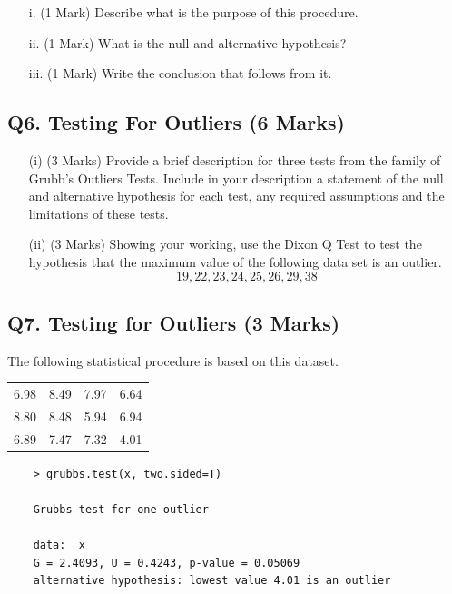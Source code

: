 \documentclass[a4paper,12pt]{article}
\begin{document}
\begin{itemize}
	\item[i.] (1 Mark) Describe what is the purpose of this procedure.
	\item[ii.] (1 Mark) What is the null and alternative hypothesis?
	\item[iii.] (1 Mark) Write the conclusion that follows from it.
\end{itemize}

\subsection*{Q6. Testing For Outliers (6 Marks)}
\begin{itemize}
	\item[(i)] (3 Marks) Provide a brief description for three tests from the family of Grubb's  Outliers Tests. Include in your description a statement of the null and alternative hypothesis for each test, any required assumptions and the limitations of these tests.
	\item[(ii)] (3 Marks) Showing your working, use the Dixon Q Test to test the hypothesis that the maximum value of the following data set is an outlier.
	\[ 19,22,23,24,25,26,29,38\]
\end{itemize}

\newpage
\subsection*{Q7. Testing for Outliers (3 Marks)} %
The following statistical procedure is based on this dataset.
\begin{center}
\begin{tabular}{|cccc|}
	\hline
	6.98 &8.49 &7.97& 6.64\\
	8.80 &8.48 &5.94& 6.94\\
	6.89 &7.47 &7.32& 4.01\\
	\hline
\end{tabular}
\end{center}

\begin{framed}

	\begin{verbatim}
	> grubbs.test(x, two.sided=T)
	
	Grubbs test for one outlier
	
	data:  x
	G = 2.4093, U = 0.4243, p-value = 0.05069
	alternative hypothesis: lowest value 4.01 is an outlier
	\end{verbatim}
\end{framed}
\end{document}
